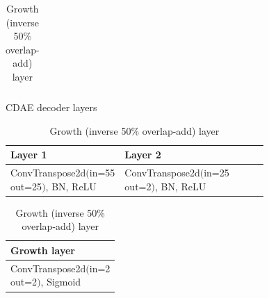 \documentclass[report.tex]{subfiles}
\begin{document}
\begin{table}[ht]
\begin{tabular}{ |l|l|l|l|l| }
	 \hline
\end{tabular}
	\vspace{1em}
	\caption{CDAE decoder layers}
	\label{table:convtable4}
\begin{tabular}{ |l|l|l|l|l| }
	 \hline
		Layer 1 & Layer 2 \\
	 \hline
	 \hline
		ConvTranspose2d$\Big($\makecell[l]{in=55\\out=25}$\Big)$, BN, ReLU & ConvTranspose2d$\Big($\makecell[l]{in=25\\out=2}$\Big)$, BN, ReLU \\
	 \hline
\end{tabular}
	\vspace{1em}
	\caption{Growth (inverse 50\% overlap-add) layer}
	\label{table:convtable5}
\begin{tabular}{ |l| }
	 \hline
		Growth layer \\
	 \hline
	 \hline
		ConvTranspose2d$\Big($\makecell[l]{in=2\\out=2}$\Big)$, Sigmoid \\
	 \hline
\end{tabular}
\end{table}
\end{document}
